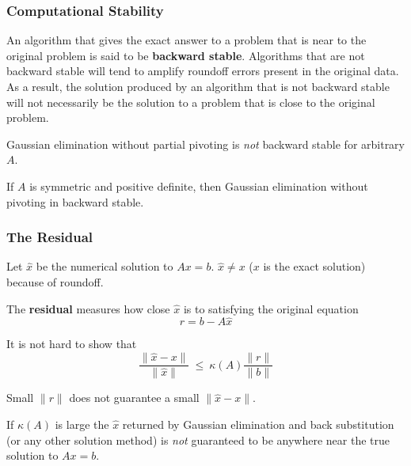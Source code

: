 \documentclass[10pt]{beamer}
\newcommand{\norm}[1]{{\ensuremath{{\|#1\|}}}}
\begin{document}
\begin{frame}
\frametitle{Computational Stability}

An algorithm that gives the exact answer to a problem that is
near to the original problem is said to be \textbf{backward stable}.
Algorithms that are not backward stable will tend to amplify
roundoff errors present in the original data.  As a result, the
solution produced by an algorithm that is not backward stable will
not necessarily be the solution to a problem that is close to the
original problem.

Gaussian elimination without partial pivoting is \emph{not}
backward stable for arbitrary $A$.  

If $A$ is symmetric and positive
definite, then Gaussian elimination without pivoting in backward stable.


\end{frame}
\begin{frame}
\frametitle{The Residual}

Let $\hat{x}$ be the numerical solution to $Ax=b$.
$\hat{x}\neq x$  ($x$ is the exact solution) because of roundoff.

The \textbf{residual} measures how close $\hat{x}$ is to satisfying
the original equation
\begin{equation*}
    r = b - A\hat{x}
\end{equation*}

It is not hard to show that
\begin{equation*}
    \frac{\norm{\hat{x} - x}}{\norm{\hat{x}}}
       \ \le\ \kappa(A) \frac{\norm{r}}{\norm{b}}
\end{equation*}

Small \norm{r} does not guarantee a small \norm{\hat{x}-x}.

If $\kappa(A)$ is large the $\hat{x}$ returned by Gaussian
elimination and back substitution (or any other solution method) is \emph{not}
guaranteed to be anywhere near the true solution to $Ax=b$.

\end{frame}
\end{document}
